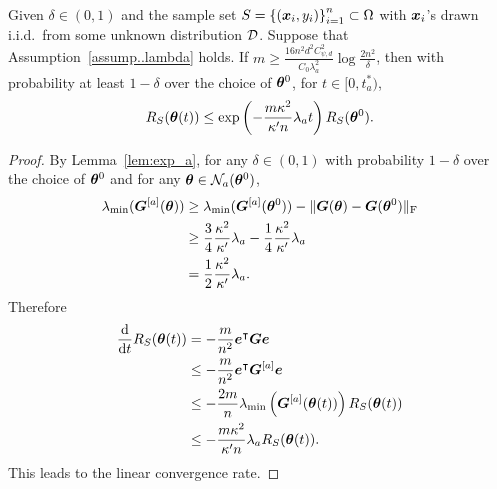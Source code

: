 \documentclass{article}
\begin{document}
\begin{prop}
    Given $\delta\in(0,1)$ and the sample set $S = {\{(\bm{x}_i, y_i)\}}_{i=1}^n\subset\Omega$ with $\bm{x}_i$'s drawn i.i.d.\ from some unknown distribution $\mathcal{D}$. Suppose that Assumption~\ref{assump..lambda} holds. If $m\geq\frac{16n^2d^2C_{\psi,d}^2}{C_0\lambda_a^2}\log\frac{2n^2}{\delta}$, then with probability at least $1-\delta$ over the choice of $\bm{\theta}^0$, for $t\in[0,t^*_a)$,
    \begin{equation}
        R_S(\bm{\theta}(t))\leq\exp\left(-\frac{m\kappa^2}{\kappa'n}\lambda_at\right)R_S(\bm{\theta}^0).
    \end{equation}
\end{prop}
\begin{proof}
    By Lemma~\ref{lem:exp_a}, for any $\delta\in(0,1)$ with probability $1-\delta$ over the choice of $\bm{\theta}^0$ and for any $\bm{\theta}\in\mathcal{N}_a(\bm{\theta}^0)$,
    \begin{equation*}
        \begin{aligned}
            \lambda_{\min}(\bm{G}^{[a]}(\bm{\theta}))
             & \geq\lambda_{\min}(\bm{G}^{[a]}(\bm{\theta}^0))-\lVert\bm{G}(\bm{\theta})-\bm{G}(\bm{\theta}^0)\rVert_\mathrm{F}         \\
             & \geq \frac{3}{4}\frac{\kappa^2}{\kappa'}\lambda_a-\frac{1}{4}\frac{\kappa^2}{\kappa'}\lambda_a \\
             & = \frac{1}{2}\frac{\kappa^2}{\kappa'}\lambda_a.
        \end{aligned}
    \end{equation*}
    Therefore
    \begin{equation*}
        \begin{aligned}
            \frac{\mathrm{d}}{\mathrm{d} t}R_S(\bm{\theta}(t))
             & = -\frac{m}{n^2}\bm{e}^{\intercal}\bm{G}\bm{e}                                                    \\
             & \leq -\frac{m}{n^2}\bm{e}^{\intercal}\bm{G}^{[a]}\bm{e}                                           \\
             & \leq -\frac{2m}{n}\lambda_{\min}\left(\bm{G}^{[a]}(\bm{\theta}(t))\right)R_S(\bm{\theta}(t)) \\
             & \leq -\frac{m\kappa^2}{\kappa'n}\lambda_aR_S(\bm{\theta}(t)).
        \end{aligned}
    \end{equation*}
    This leads to the linear convergence rate.
\end{proof}
\end{document}
